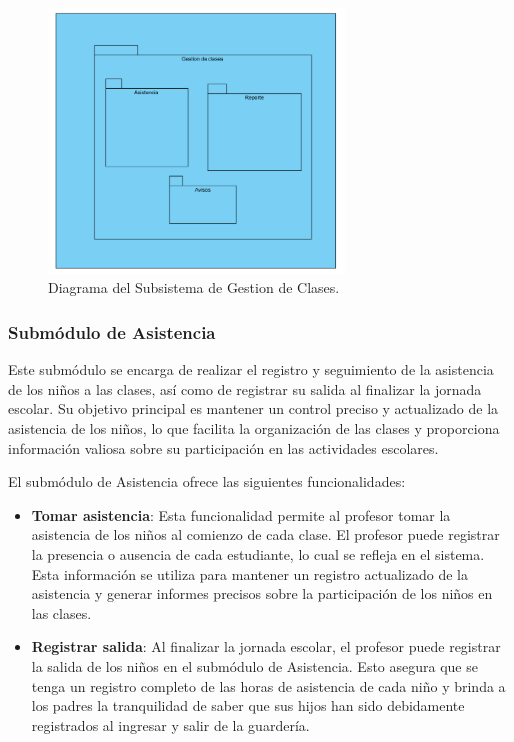 \begin{figure}[htbp]
\centering
\includegraphics[width=0.7\textwidth]{images/arqui/subSisGestClases.png}
\caption{Diagrama del Subsistema de Gestion de Clases.}
\label{fig:subsistGestionClases}
\end{figure}

\subsubsection{Submódulo de Asistencia}

Este submódulo se encarga de realizar el registro y seguimiento de la asistencia de los niños a las clases, así como de registrar su salida al finalizar la jornada escolar. Su objetivo principal es mantener un control preciso y actualizado de la asistencia de los niños, lo que facilita la organización de las clases y proporciona información valiosa sobre su participación en las actividades escolares.

El submódulo de Asistencia ofrece las siguientes funcionalidades:

\begin{itemize}
\item \textbf{Tomar asistencia}: Esta funcionalidad permite al profesor tomar la asistencia de los niños al comienzo de cada clase. El profesor puede registrar la presencia o ausencia de cada estudiante, lo cual se refleja en el sistema. Esta información se utiliza para mantener un registro actualizado de la asistencia y generar informes precisos sobre la participación de los niños en las clases.

\item \textbf{Registrar salida}: Al finalizar la jornada escolar, el profesor puede registrar la salida de los niños en el submódulo de Asistencia. Esto asegura que se tenga un registro completo de las horas de asistencia de cada niño y brinda a los padres la tranquilidad de saber que sus hijos han sido debidamente registrados al ingresar y salir de la guardería.
\end{itemize}




